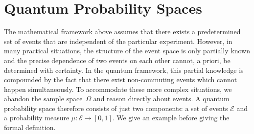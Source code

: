 \documentclass{article}
\theoremstyle{remark}
\newcommand{\qevents}{\ensuremath{\mathcal{E}}}
\newcommand{\pmeas}{\ensuremath{\mu}}
\newcommand{\imposs}{{\mbox{\wesa{impossible}}}}
\newcommand{\likely}{{\mbox{\wesa{likely}}}}
\newcommand{\unlikely}{{\mbox{\wesa{unlikely}}}}
\newcommand{\necess}{{\mbox{\wesa{certain}}}}
\begin{document}

\section{Quantum Probability Spaces}

The mathematical framework above assumes that there exists a
predetermined set of events that are independent of the particular
experiment. However, in many practical situations, the structure of
the event space is only partially known and the precise dependence of
two events on each other cannot, a priori, be determined with
certainty. In the quantum framework, this partial knowledge is
compounded by the fact that there exist non-commuting events which
cannot happen simultaneously. To accommodate these more complex
situations, we abandon the sample space~$\Omega$ and reason directly
about events. A quantum probability space therefore consists of just
two components: a set of events $\qevents$ and a probability measure
$\mu : \qevents \rightarrow [0,1]$. We give an example before giving
the formal definition.
\end{document}

